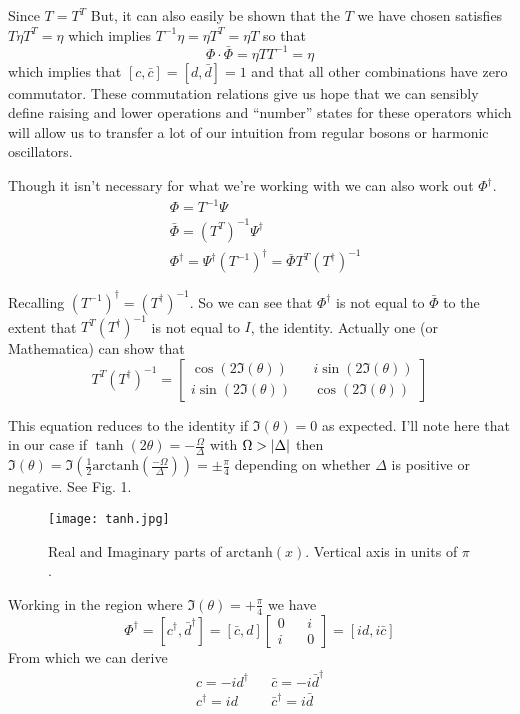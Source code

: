 \documentclass[12pt]{article}
\begin{document}
Since $T=T^T$ But, it can also easily be shown that the $T$ we have chosen satisfies $T\eta T^{T} = \eta$ which implies $T^{-1} \eta = \eta T^{T} = \eta T$ so that
\begin{equation}
\label{phicom}
\Phi \cdot \bar{\Phi} = \eta T T^{-1} = \eta
\end{equation}
which implies that $[c,\bar{c}]=[d,\bar{d}] = 1$ and that all other combinations have zero commutator. These commutation relations give us hope that we can sensibly define raising and lower operations and ``number'' states for these operators which will allow us to transfer a lot of our intuition from regular bosons or harmonic oscillators.

Though it isn't necessary for what we're working with we can also work out $\Phi^{\dag}$.
\begin{align}
&\Phi = T^{-1} \Psi\\
&\bar{\Phi} = (T^T)^{-1}\Psi^{\dag}\\
&\Phi^{\dag} = \Psi^{\dag} (T^{-1})^{\dag} = \bar{\Phi} T^T (T^{\dag})^{-1}
\end{align}

Recalling $(T^{-1})^{\dag} = (T^{\dag})^{-1}$. So we can see that $\Phi^{\dag}$ is not equal to $\bar{\Phi}$ to the extent that $T^T (T^{\dag})^{-1}$ is not equal to $I$, the identity. Actually one (or Mathematica) can show that 
\begin{equation}
T^T (T^{\dag})^{-1} = 
\begin{bmatrix}
\cos(2 \Im(\theta)) && i \sin(2\Im(\theta))\\
i \sin(2\Im(\theta)) && \cos(2 \Im(\theta))
\end{bmatrix}
\end{equation}

This equation reduces to the identity if $\Im(\theta)=0$ as expected. I'll note here that in our case if $\tanh(2 \theta) = -\frac{\Omega}{\Delta}$ with $\Omega > \abs{\Delta}$ then $\Im(\theta) =\Im\left(\frac{1}{2}\text{arctanh}\left(\frac{-\Omega}{\Delta}\right)\right) = \pm \frac{\pi}{4}$ depending on whether $\Delta$ is positive or negative. See Fig. 1.

\begin{figure}[t]
\centering
\texttt{[image: tanh.jpg]}
\caption{Real and Imaginary parts of $\text{arctanh}(x)$. Vertical axis in units of $\pi$.}
\end{figure}

Working in the region where $\Im(\theta) = +\frac{\pi}{4}$ we have
\begin{equation}
\Phi^{\dag} = [c^{\dag}, \bar{d}^{\dag}] = [\bar{c},d] \begin{bmatrix}0&&i\\i&&0\end{bmatrix} = [id,i\bar{c}]
\end{equation}
From which we can derive
\begin{align*}
c = -id^{\dag} && \bar{c} = -i\bar{d}^{\dag}\\
c^{\dag} = id && \bar{c}^{\dag} = i\bar{d}
\end{align*}
\end{document}
